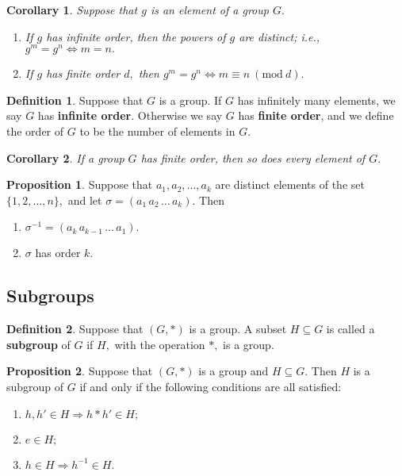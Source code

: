 \documentclass[12pt, a4paper]{article}
\newcommand{\imply}{\Rightarrow}
\newcommand{\Mod}[1]{\ (\mathrm{mod}\ #1)}
\theoremstyle{definition}
\newtheorem{definition}{Definition}[section]
\newtheorem{proposition}{Proposition}
\theoremstyle{plain}
\newtheorem{corollary}{Corollary}[theorem]
\begin{document}
\begin{corollary}
Suppose that $g$ is an element of a group $G.$
\begin{enumerate}
	\item If $g$ has infinite order, then the powers of $g$ are distinct; i.e., $g^m = g^n \iff m=n.$

	\item If $g$ has finite order $d,$ then $g^m = g^n \iff m \equiv n \Mod{d}.$
\end{enumerate}
\end{corollary}

\begin{definition}
Suppose that $G$ is a group. If $G$ has infinitely many elements, we say $G$ has \textbf{infinite order}. Otherwise we say $G$ has \textbf{finite order}, and we define the order of $G$ to be the number of elements in $G.$
\end{definition}

\begin{corollary}
If a group $G$ has finite order, then so does every element of $G.$
\end{corollary}

\begin{proposition}
Suppose that $a_1, a_2,\ldots, a_k$ are distinct elements of the set $\{1,2,\ldots,n\},$ and let $\sigma = (a_1 \, a_2 \, \ldots \, a_k).$ Then
\begin{enumerate}
	
	\item $\sigma^{-1} = (a_k \, a_{k-1} \, \ldots \, a_1).$

	\item $\sigma$ has order $k.$

\end{enumerate}
\end{proposition}

\subsection{Subgroups}

\begin{definition}
Suppose that $(G,*)$ is a group. A subset $H \subseteq G$ is called a \textbf{subgroup} of $G$ if $H,$ with the operation $*,$ is a group.
\end{definition}

\begin{proposition}
Suppose that $(G, *)$ is a group and $H \subseteq G.$ Then $H$ is a subgroup of $G$ if and only if the following conditions are all satisfied:
\begin{enumerate}
	
	\item $h,h'\in H \imply h*h'\in H;$

	\item $e \in H;$

	\item $h\in H \imply h^{-1} \in H.$

\end{enumerate}
\end{proposition}
\end{document}
